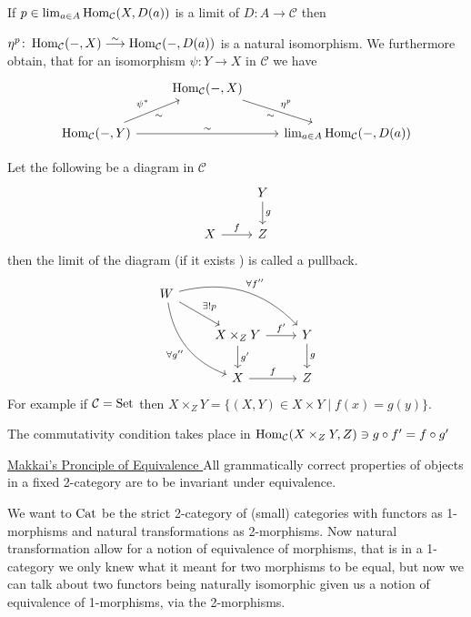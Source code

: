 If $ p \in \lim_{a \in A} \operatorname{Hom}_{ \mathcal{ C } } ( X , D ( a ) ) $ is a limit of $ D \colon A \to \mathcal{ C } $ then 

$ \eta^p \colon \Hom_{ \mathcal{ C } } ( - ,  X ) \isomorphism \Hom_{ \mathcal{ C } } ( - , D ( a ) ) $ is a natural isomorphism. 
We furthermore obtain, that for an isomorphism $\psi \colon Y \to X $ in $\mathcal{ C } $ we have 
\[
\begin{tikzcd}
    & 
    \Hom_{\mathcal{ C } } ( - , X ) 
    \ar[rd, " \eta^p ", "\sim"']
    \\
    \Hom_{ \mathcal{ C } } ( - , Y ) 
    \ar[ru , " \psi^*" , " \sim"' ]
    \ar[rr, " \sim " ]
    &&
    \lim_{ a \in A } \Hom_{ \mathcal{ C } } ( - , D ( a ) ) 
\end{tikzcd}
\]
\begin{exmp}
    Let the following be a diagram in $ \mathcal{ C } $ 
    \[
    \begin{tikzcd}
        &
        Y
        \ar[d , "g" ]
        \\
        X
        \ar[r, "f" ]
        &
        Z
    \end{tikzcd}
    \]
    then the limit of the diagram (if it exists ) is called a pullback.
    \[
    \begin{tikzcd}
        W
        \ar[rrd, bend left, "\forall f'' " ]
        \ar[rd, " \exists! p "]
        \ar[rdd, bend right, " \forall g'' "' ]
        \\
        &
        X \times_Z Y 
        \ar[ r , " f'" ]
        \ar[d, " g' "]
        &
        Y
        \ar[d, " g "]
        \\
        &
        X
        \ar[r, "f"]
        &
        Z
    \end{tikzcd}
    \]
    For example if $ \mathcal{ C } = \operatorname{Set}$ then $ X  \times_Z Y = \{ ( X , Y ) \in X \times Y \mid f ( x ) = g ( y ) \}$.
\end{exmp}

The commutativity condition takes place in $ \operatorname{Hom}_{ \mathcal{ C } } ( X \times_Z Y , Z ) \ni g \circ f' = f \circ g' $

\underline{ Makkai's Pronciple of Equivalence }
All grammatically correct properties of objects in a fixed 2-category are to be invariant under equivalence.

\begin{rmk}
    We want to $ \operatorname{Cat} $ be the strict 2-category of (small) categories with functors as 1-morphisms and natural transformations as 2-morphisms.
    Now natural transformation allow for a notion of equivalence of morphisms, that is in a 1-category we only knew what it meant for two morphisms to be equal, but now we can talk about two functors being naturally isomorphic given us a notion of equivalence of 1-morphisms, via the 2-morphisms.
\end{rmk}

